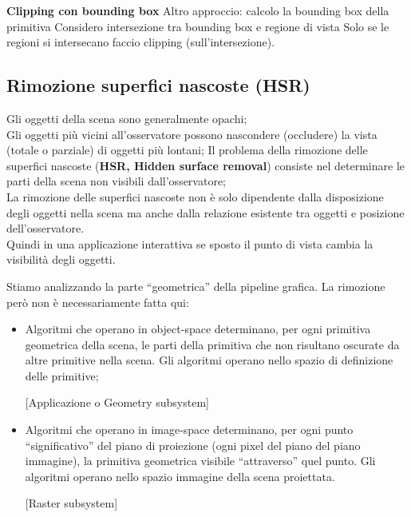 \documentclass[a4paper, 10pt]{article}
\begin{document}
	\noindent
	\textbf{Clipping con bounding box}
	Altro approccio: calcolo la bounding box della primitiva
	Considero intersezione tra bounding box e regione di vista
	Solo se le regioni si intersecano faccio clipping
	(sull'intersezione).
	
	\subsection{Rimozione superfici nascoste (HSR)}
	Gli oggetti della scena sono generalmente opachi;\\
	Gli oggetti più vicini all’osservatore possono nascondere (occludere) la vista (totale o parziale) di oggetti più lontani; Il problema della rimozione delle superfici nascoste (\textbf{HSR, Hidden surface removal}) consiste nel determinare le parti della
	scena non visibili dall’osservatore;\\
	La rimozione delle superfici nascoste non è solo dipendente dalla disposizione degli oggetti nella scena ma anche dalla relazione esistente tra oggetti e posizione dell’osservatore.\\
	Quindi in una applicazione interattiva se sposto il punto di vista cambia la visibilità degli oggetti.
	
	\bigskip
	
	Stiamo analizzando la parte “geometrica” della pipeline grafica. La rimozione però non è necessariamente fatta qui:
	\begin{itemize}
		\item Algoritmi che operano in object-space determinano, per ogni primitiva geometrica della scena, le parti della primitiva che non risultano oscurate da altre primitive nella scena. Gli algoritmi operano nello spazio di definizione delle primitive;
		
		[Applicazione o Geometry subsystem]
		
		\item Algoritmi che operano in image-space determinano, per ogni punto “significativo” del piano di proiezione (ogni pixel del piano del piano immagine), la primitiva geometrica visibile “attraverso” quel punto. Gli algoritmi operano nello spazio immagine della scena proiettata.
		
		[Raster subsystem]
	\end{itemize}
	
\end{document}

